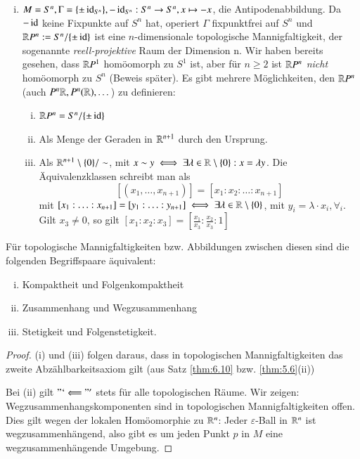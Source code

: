 \documentclass[a4paper,10pt]{scrartcl}
\newcommand{\eps}{\varepsilon}
\begin{document}
\begin{exs*}
 \begin{enumerate}[(i)]
  \item $M=S^n, \Gamma=\{\pm \operatorname{id}_{S^n}\}, -\operatorname{id}_{S^n}: S^n\to S^n, x\mapsto -x$, die Antipodenabbildung. Da $-\operatorname{id}$ keine Fixpunkte 
auf $S^n$ hat, operiert $\Gamma$ fixpunktfrei auf $S^n$ und $\mathbb{R} P^n := S^n/\{\pm \operatorname{id}\}$ ist eine $n$-dimensionale topologische Mannigfaltigkeit,
 der sogenannte \emph{reell-projektive} Raum der Dimension n. Wir haben bereits gesehen, dass $\mathbb{R} P^1$ homöomorph zu $S^1$ ist, aber für $n \geq 2$ ist $\mathbb{R} P^n$ \emph{nicht} homöomorph zu $S^n$ (Beweis später). Es gibt mehrere Möglichkeiten, den $\mathbb{R} P^n$ (auch $P^n \mathbb{R}, P^n(\mathbb{R}), \dotsc$) zu definieren:
\begin{enumerate}[(i)]
\item $\mathbb{R} P^n=S^n/\{\pm\operatorname{id}\}$ 
\item Als Menge der Geraden in $\mathbb{R}^{n+1}$ durch den Ursprung.
\item Als $\mathbb{R}^{n+1}\setminus \{0\}/\sim$, mit $x\sim y \iff \exists \lambda\in \mathbb{R}\setminus\{0\}: x=\lambda y$. Die Äquivalenzklassen schreibt man als 
\[
[(x_1,\dotsc,x_{n+1})]=[x_1:x_2:\dotsc: x_{n+1}] 
\]
mit $[x_1:\dotsc:x_{n+1}]=[y_1:\dotsc:y_{n+1}]\iff \exists \lambda\in \mathbb{R}\setminus\{0\}$, mit $y_i=\lambda\cdot x_i, \forall_i$.
Gilt $x_3\neq 0$, so gilt $[x_1:x_2:x_3]=[\frac{x_1}{x_3}:\frac{x_2}{x_3}:1]$
\begin{figure}[H]
\centering
 \fixme[fig34]
\caption{}
\end{figure}
\end{enumerate}  
\end{enumerate}
\end{exs*}
\begin{st}
 Für topologische Mannigfaltigkeiten bzw. Abbildungen zwischen diesen sind die folgenden Begriffspaare äquivalent:
\begin{enumerate}[(i)]
 \item Kompaktheit und Folgenkompaktheit
 \item Zusammenhang und Wegzusammenhang
 \item Stetigkeit und Folgenstetigkeit.
\end{enumerate}
\end{st}
\begin{figure}[H]
\centering
 \fixme[fig35]
\caption{}
\end{figure}
\begin{proof}
 (i) und (iii) folgen daraus, dass in topologischen Mannigfaltigkeiten das zweite Abzählbarkeitsaxiom gilt (aus Satz \ref{thm:6.10} bzw. \ref{thm:5.6}(ii))

Bei (ii) gilt $"`\Longleftarrow"'$ stets für alle topologischen Räume. Wir zeigen: Wegzusammenhangskomponenten sind in topologischen Mannigfaltigkeiten offen. Dies gilt wegen der lokalen Homöomorphie zu $\mathbb{R}^n$:
Jeder $\eps$-Ball in $\mathbb{R}^n$ ist wegzusammenhängend, also gibt es um jeden Punkt $p$ in $M$ eine wegzusammenhängende Umgebung.
\end{proof}
\end{document}
